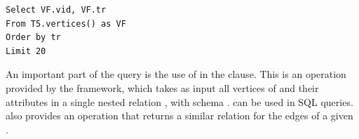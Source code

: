 \begin{small}
\begin{verbatim}
Select VF.vid, VF.tr
From T5.vertices() as VF
Order by tr
Limit 20
\end{verbatim}
\end{small}

An important part of the query is the use of  in
the  clause. This is an operation provided by the \sys
framework, which takes as input all vertices of  and their
attributes in a single nested relation , with schema
.  can be
used in SQL queries. \sys also provides an operation 
that returns a similar relation for the edges of a given \tg.




